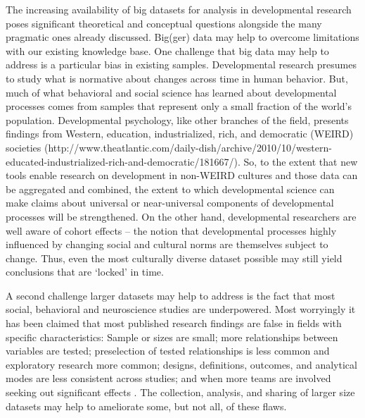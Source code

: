 \documentclass[letterpaper,man,apacite]{apa6}
\begin{document}
The increasing availability of big datasets for analysis in developmental research poses significant theoretical and conceptual questions alongside the many pragmatic ones already discussed.
Big(ger) data may help to overcome limitations with our existing knowledge base.
One challenge that big data may help to address is a particular bias in existing samples.
Developmental research presumes to study what is normative about changes across time in human behavior.
But, much of what behavioral and social science has learned about developmental processes comes from samples that represent only a small fraction of the world's population.
Developmental psychology, like other branches of the field, presents findings from Western, education, industrialized, rich, and democratic (WEIRD) societies (http://www.theatlantic.com/daily-dish/archive/2010/10/western-educated-industrialized-rich-and-democratic/181667/).
So, to the extent that new tools enable research on development in non-WEIRD cultures and those data can be aggregated and combined, the extent to which developmental science can make claims about universal or near-universal components of developmental processes will be strengthened.
On the other hand, developmental researchers are well aware of cohort effects -- the notion that developmental processes highly influenced by changing social and cultural norms are themselves subject to change.
Thus, even the most culturally diverse dataset possible may still yield conclusions that are `locked' in time.

A second challenge larger datasets may help to address is the fact that most social, behavioral \cite{Maxwell-2004} and neuroscience studies \cite{Button-NRN} are underpowered.
Most worryingly it has been claimed that most published research findings are false in fields with specific characteristics: Sample or sizes are small; more relationships between variables are tested; preselection of tested relationships is less common and exploratory research more common; designs, definitions, outcomes, and analytical modes are less consistent across studies; and when more teams are involved seeking out significant effects \cite{Ioanidis}.
The collection, analysis, and sharing of larger size datasets may help to ameliorate some, but not all, of these flaws.
\end{document}
